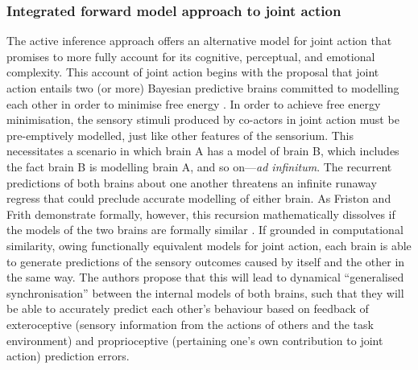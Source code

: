\begin{CJK}{UTF8}{gbsn}
\subsubsection{Integrated forward model approach to joint action}
The active inference approach offers an alternative model for joint action that promises to more fully account for its cognitive, perceptual, and emotional complexity.  This account of joint action begins with the proposal that joint action entails two (or more) Bayesian predictive brains committed to modelling each other in order to minimise free energy \citep{Friston2015,Friston2015a}. In order to achieve free energy minimisation, the sensory stimuli produced by co-actors in joint action must be pre-emptively modelled, just like other features of the sensorium.  This necessitates a scenario in which brain A has a model of brain B, which includes the fact brain B is modelling brain A, and so on---\textit{ad infinitum}.  The recurrent predictions of both brains about one another threatens an infinite runaway regress that could preclude accurate modelling of either brain.  As Friston and Frith demonstrate formally, however, this recursion mathematically dissolves if the models of the two brains are formally similar \citep{Friston2015}.  If grounded in computational similarity, owing functionally equivalent models for joint action, each brain is able to generate predictions of the sensory outcomes caused by itself and the other in the same way.  The authors propose that this will lead to dynamical ``generalised synchronisation'' \citep{Barreto2003} between the internal models of both brains, such that they will be able to accurately predict each other's behaviour based on feedback of exteroceptive (sensory information from the actions of others and the task environment) and proprioceptive (pertaining one's own contribution to joint action) prediction errors.


\end{CJK}
